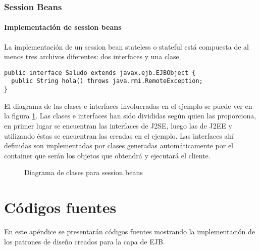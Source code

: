 \documentclass[12pt,oneside,letterpaper]{report}
\newenvironment{codigoenv}
{\fontsize{10pt}{12pt} \linespread{1}} { \normalsize}
\newenvironment{figuraenv}
{\begin{figure}[htb]\begin{center}} {\end{center}\end{figure}}
\begin{document}
\subsection{Session Beans}

\subsubsection{Implementación de session beans}

La implementación de un session bean stateless o stateful está compuesta
de al menos tres archivos diferentes: dos interfaces y una clase.

\begin{codigoenv}
\begin{verbatim}
public interface Saludo extends javax.ejb.EJBObject {
  public String hola() throws java.rmi.RemoteException;
}
\end{verbatim}
\end{codigoenv}


El diagrama de las clases e interfaces involucradas en el ejemplo se puede
ver en la figura \ref{fig:simp}. Las clases e interfaces han sido
divididas según quien las proporciona, en primer lugar se encuentran las
interfaces de J2SE, luego las de J2EE y utilizando éstas se encuentran las
creadas en el ejemplo. Las interfaces ahí definidas son implementadas por
clases generadas automáticamente por el container que serán los objetos
que obtendrá y ejecutará el cliente.

\begin{figuraenv}
\caption{Diagrama de clases para session beans} \label{fig:simp}
\end{figuraenv}






\nocite{ejb} \nocite{j2ee} \nocite{servlet} \nocite{jsp} \nocite{jndi}
\nocite{connector} \nocite{jta} \nocite{jts} \nocite{jaxp}






\appendix
\newpage
\chapter{Códigos fuentes}

En este apéndice se presentarán códigos fuentes mostrando la
implementación de los patrones de diseño creados para la capa de EJB.


\end{document}
